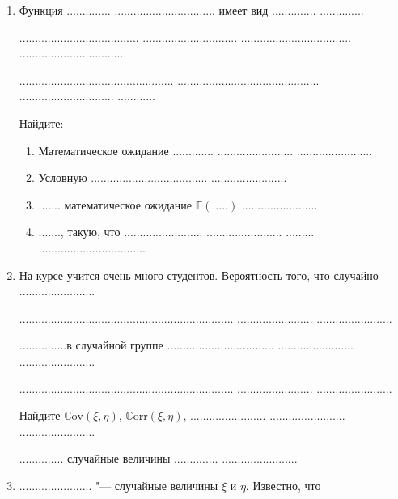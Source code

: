\documentclass[10pt,a4paper]{article}
\newcommand{\E}{\mathbb{E}}
\newcommand{\Corr}{\mathbb{C}\mathrm{orr}}
\newcommand{\Cov}{\mathbb{C}\mathrm{ov}}
\begin{document}

\pagestyle{fancy}

\fancyhf{}


\begin{enumerate}
\item Функция .............. ................................ имеет вид .............. ..............

...................................... .............................. ................................... .................................

................................................. .............................................  .............................. ............

Найдите:
\begin{enumerate}
\item Математическое ожидание ............. ........................  ........................
\item Условную .....................................  ........................
\item .......  математическое ожидание $\E(.....)$  ........................
\item ......., такую, что ......................... ........................ ......... ..................................
\end{enumerate}

\item На курсе учится очень много студентов. Вероятность того, что случайно   ........................

....................................................................  ........................ ........................

...............в случайной группе ..................................  ........................ ........................

....................................................................  ........................ ........................

Найдите $\Cov(\xi,\eta)$, $\Corr(\xi,\eta)$, ........................  ........................ ........................

.............. случайные величины .............. ........................

\item ....................... "--- случайные величины $\xi$ и $\eta$. Известно, что


\end{enumerate}
\end{document}
